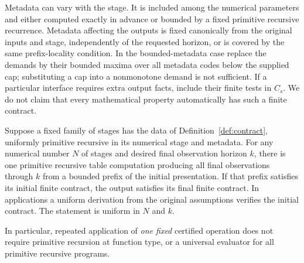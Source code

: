 Metadata can vary with the stage. It is included among the numerical
parameters and either computed exactly in advance or bounded by a fixed
primitive recursive recurrence. Metadata affecting the outputs is fixed
canonically from the original inputs and stage, independently of the
requested horizon, or is covered by the same prefix-locality condition.
In the bounded-metadata case replace the demands
by their bounded maxima over all metadata codes below the supplied cap;
substituting a cap into a nonmonotone demand is not sufficient.
If a particular interface requires extra output facts,
include their finite tests in $C_s$. We do not claim that every mathematical
property automatically has such a finite contract.

\begin{theorem}
\label{thm:demand}
Suppose a fixed family of stages has the data of
Definition~\ref{def:contract}, uniformly primitive recursive in its
numerical stage and metadata. For any numerical number $N$ of stages
and desired final observation horizon $k$, there is one primitive
recursive table computation producing all final observations through
$k$ from a bounded prefix of the initial presentation. If that prefix
satisfies its initial finite contract, the output satisfies its final
finite contract. In applications a uniform derivation from the original
assumptions verifies the initial contract. The statement is uniform
in $N$ and $k$.

In particular, repeated application of \emph{one fixed} certified
operation does not require primitive recursion at function type, or a
universal evaluator for all primitive recursive programs.
\end{theorem}
